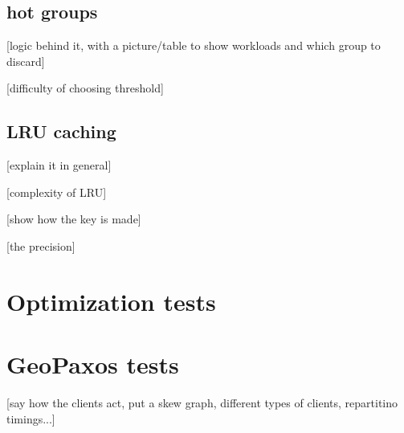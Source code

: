 \subsection{hot groups}\label{sec:hot-groups}

[logic behind it, with a picture/table to show workloads and which group to discard]

[difficulty of choosing threshold]

\subsection{LRU caching}\label{sec:LRU caching}
[explain it in general]

[complexity of LRU]

[show how the key is made]

[the precision]

\section{Optimization tests}\label{sec:optimization-tests}

\section{GeoPaxos tests}\label{sec:geopaxos-tests}
[say how the clients act, put a skew graph, different types of clients, repartitino timings...]